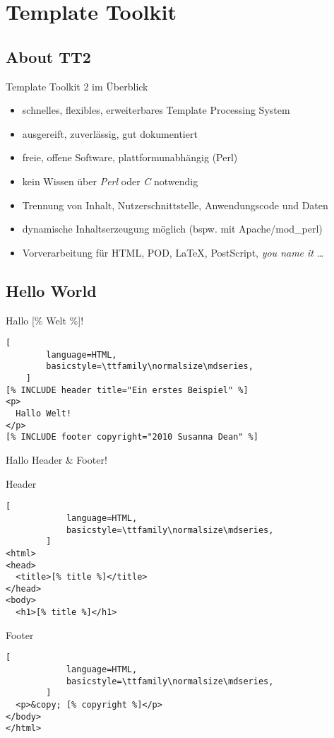 \documentclass[hyperref={pdfpagelabels=false}]{beamer}
\begin{document}
\section{Template Toolkit}

\subsection{About TT2}

\begin{frame}{Template Toolkit 2 im Überblick}
    \begin{itemize}
        \item schnelles, flexibles, erweiterbares Template Processing
            System
        \item ausgereift, zuverlässig, gut dokumentiert
        \pause
        \item freie, offene Software, plattformunabhängig (Perl)
        \item kein Wissen über \emph{Perl} oder \emph{C} notwendig
        \pause
        \item Trennung von Inhalt, Nutzerschnittstelle, Anwendungscode
            und Daten
        \item dynamische Inhaltserzeugung möglich (bspw. mit
            Apache/mod\_perl)
        \pause
        \item Vorverarbeitung für HTML, POD, \LaTeX, PostScript,
            \emph{you name it} \dots
    \end{itemize}
\end{frame}

\subsection{Hello World}

\begin{frame}[fragile]{Hallo [\% Welt \%]!}
    \begin{lstlisting}[
        language=HTML,
        basicstyle=\ttfamily\normalsize\mdseries,
    ]
[% INCLUDE header title="Ein erstes Beispiel" %]
<p>
  Hallo Welt!
</p>
[% INCLUDE footer copyright="2010 Susanna Dean" %]
    \end{lstlisting} 
\end{frame}

\begin{frame}[fragile]{Hallo Header \& Footer!}
    \begin{block}{Header}
        \begin{lstlisting}[
            language=HTML,
            basicstyle=\ttfamily\normalsize\mdseries,
        ]
<html>
<head>
  <title>[% title %]</title>
</head>
<body>
  <h1>[% title %]</h1>
        \end{lstlisting}
    \end{block}
    \pause
    \begin{block}{Footer}
        \begin{lstlisting}[
            language=HTML,
            basicstyle=\ttfamily\normalsize\mdseries,
        ]
  <p>&copy; [% copyright %]</p>
</body>
</html>
        \end{lstlisting}
    \end{block}
\end{frame}
\end{document}
